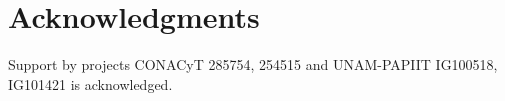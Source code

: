 \documentclass[10pt,letterpaper]{article} %
\begin{document}
% 
% 
% 
% 
% 
\section{Acknowledgments} %
Support by projects CONACyT 285754, 254515 and UNAM-PAPIIT IG100518, IG101421 is
acknowledged. 
\end{document}
